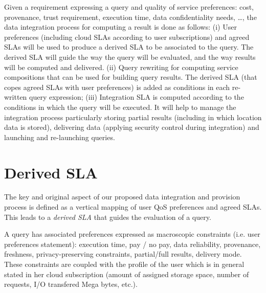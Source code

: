 Given a requirement expressing a query and quality of service preferences: cost, provenance, trust requirement, execution time, data confidentiality needs, \dots, the data integration process for computing a result is done as follows: (i) User preferences (including cloud SLAs according to user subscriptions) and agreed SLAs will be used to produce a derived SLA to be associated to the query. The derived SLA  will guide the way the query will be evaluated, and the way results will be computed and delivered.
(ii) Query rewriting for computing service compositions that can be used for  building query results. The derived SLA (that copes agreed SLAs with user preferences) is added as  conditions in  each re-written   query expression; (iii) Integration SLA is computed according to the conditions in which the query will be executed. It will help to  manage the integration process particularly storing partial results (including in  which location data is stored), delivering data (applying security control during integration) and launching and re-launching queries. 

\color{black}
\section{Derived SLA}
\label{sec:slaModel}

The key and original aspect of   our proposed data integration and provision process is  defined as a vertical mapping of user QoS preferences and agreed SLAs. This  leads to a {\em derived SLA} that guides the evaluation of a query. 

A query has associated preferences  expressed as macroscopic constraints (i.e. user preferences statement): execution time, pay / no pay, data reliability, provenance, freshness, privacy-preserving constraints, partial/full results, delivery mode. These constraints are coupled with the profile of the user which is in general stated in her cloud subscription (amount of assigned storage space, number of requests, I/O transfered Mega bytes, etc.). 

